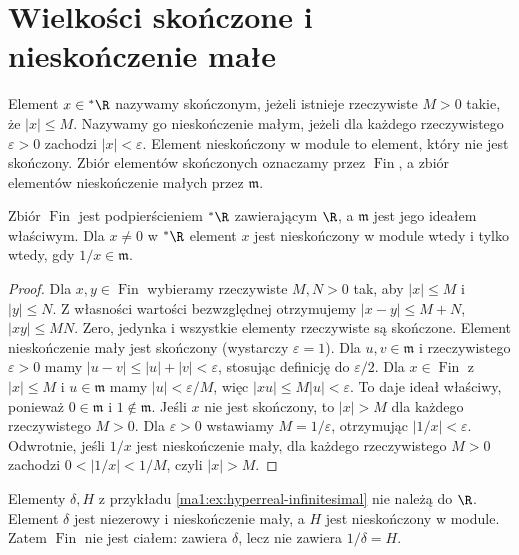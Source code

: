 \section{Wielkości skończone i nieskończenie małe}
\begin{definicja}
\label{ma1:def:finite-infinitesimal}
Element $x\in{}^*\R$ nazywamy skończonym, jeżeli istnieje rzeczywiste $M>0$ takie, że $|x|\le M$. Nazywamy go nieskończenie małym, jeżeli dla każdego rzeczywistego $\varepsilon>0$ zachodzi $|x|<\varepsilon$. Element nieskończony w module to element, który nie jest skończony. Zbiór elementów skończonych oznaczamy przez $\operatorname{Fin}$, a zbiór elementów nieskończenie małych przez $\mathfrak m$.
\end{definicja}
\begin{lemat}
\label{ma1:lem:finite-ring}
Zbiór $\operatorname{Fin}$ jest podpierścieniem $\mathord{}^*\R$ zawierającym $\R$, a $\mathfrak m$ jest jego ideałem właściwym. Dla $x\ne0$ w $\mathord{}^*\R$ element $x$ jest nieskończony w module wtedy i tylko wtedy, gdy $1/x\in\mathfrak m$.
\end{lemat}
\begin{proof}
Dla $x,y\in\operatorname{Fin}$ wybieramy rzeczywiste $M,N>0$ tak, aby $|x|\le M$ i $|y|\le N$. Z własności wartości bezwzględnej otrzymujemy $|x-y|\le M+N$, $|xy|\le MN$. Zero, jedynka i wszystkie elementy rzeczywiste są skończone.
Element nieskończenie mały jest skończony (wystarczy $\varepsilon=1$). Dla $u,v\in\mathfrak m$ i rzeczywistego $\varepsilon>0$ mamy $|u-v|\le |u|+|v|<\varepsilon$, stosując definicję do $\varepsilon/2$. Dla $x\in\operatorname{Fin}$ z $|x|\le M$ i $u\in\mathfrak m$ mamy $|u|<\varepsilon/M$, więc $|xu|\le M|u|<\varepsilon$. To daje ideał właściwy, ponieważ $0\in\mathfrak m$ i $1\notin\mathfrak m$.
Jeśli $x$ nie jest skończony, to $|x|>M$ dla każdego rzeczywistego $M>0$. Dla $\varepsilon>0$ wstawiamy $M=1/\varepsilon$, otrzymując $|1/x|<\varepsilon$. Odwrotnie, jeśli $1/x$ jest nieskończenie mały, dla każdego rzeczywistego $M>0$ zachodzi $0<|1/x|<1/M$, czyli $|x|>M$.
\end{proof}
\begin{przyklad}
Elementy $\delta,H$ z przykładu \ref{ma1:ex:hyperreal-infinitesimal} nie należą do $\R$. Element $\delta$ jest niezerowy i nieskończenie mały, a $H$ jest nieskończony w module. Zatem $\operatorname{Fin}$ nie jest ciałem: zawiera $\delta$, lecz nie zawiera $1/\delta=H$.
\end{przyklad}

